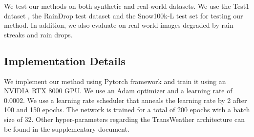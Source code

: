 \documentclass[10pt,twocolumn,letterpaper]{article}
\begin{document}
We test our methods on both synthetic and real-world datasets. We use the Test1 dataset \cite{li2020all, li2019heavy}, the RainDrop test dataset \cite{qian2018attentive} and the Snow100k-L test set \cite{liu2018desnownet} for testing our method. In addition, we also evaluate on real-world images degraded by rain streaks and rain drops.

\subsection{Implementation Details}
We implement our method using Pytorch framework \cite{NEURIPS2019_9015} and train it using an NVIDIA RTX 8000 GPU. We use an Adam optimizer \cite{kingma2014adam} and a learning rate of 0.0002. We use a learning rate scheduler that anneals the learning rate by 2 after 100 and 150 epochs. The network is trained for a total of 200 epochs with a batch size of 32. Other hyper-parameters regarding the TransWeather architecture can be found in the supplementary document.
\end{document}
